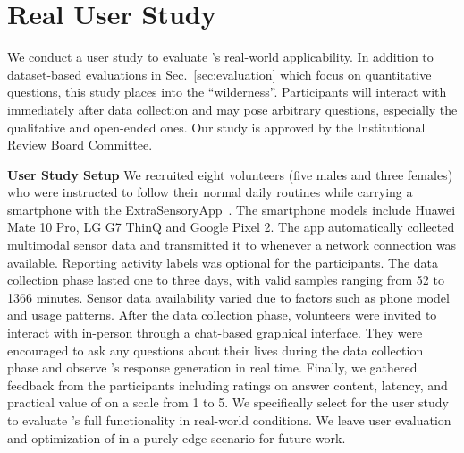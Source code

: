 \section{Real User Study}
\label{sec:deployment}


We conduct a user study to evaluate \Method's real-world applicability. 
In addition to dataset-based evaluations in Sec.~\ref{sec:evaluation} which focus on quantitative questions, this study places \Method into the ``wilderness''. Participants will interact with \Method immediately after data collection and may pose arbitrary questions, especially the qualitative and open-ended ones.
Our study is approved by the Institutional Review Board Committee.

\textbf{User Study Setup} We recruited eight volunteers (five males and three females) who were instructed to follow their normal daily routines while carrying a smartphone with the ExtraSensoryApp~\cite{vaizman2018extrasensory}. The smartphone models include Huawei Mate 10 Pro, LG G7 ThinQ and Google Pixel 2. The app automatically collected multimodal sensor data and transmitted it to \Method whenever a network connection was available. Reporting activity labels was optional for the participants. The data collection phase lasted one to three days, with valid samples ranging from 52 to 1366 minutes. Sensor data availability varied due to factors such as phone model and usage patterns. After the data collection phase, volunteers were invited to interact with \MethodC in-person through a chat-based graphical interface. They were encouraged to ask any questions about their lives during the data collection phase and observe \MethodC's response generation in real time. Finally, we gathered feedback from the participants including ratings on answer content, latency, and practical value of \Method on a scale from 1 to 5. %
%
We specifically select \MethodC for the user study to evaluate \Method's full functionality in real-world conditions. We leave user evaluation and optimization of \MethodE in a purely edge scenario for future work.


